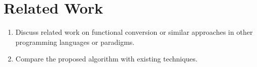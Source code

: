 \section{Related Work}

\begin{enumerate}
    \item Discuss related work on functional conversion or similar approaches in other programming languages or paradigms.
    \item Compare the proposed algorithm with existing techniques.
\end{enumerate}